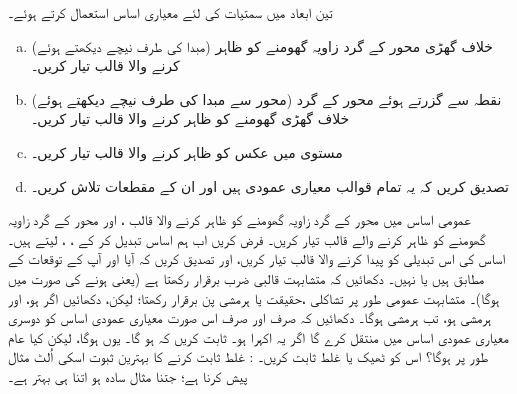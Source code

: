 تین ابعاد میں سمتیات کی لئے معیاری اساس  استعمال کرتے ہوئے۔
\begin{enumerate}[a.]
\item
(مبدا  کی طرف نیچے دیکھتے ہوئے)  خلاف گھڑی  محور کے گرد زاویہ  گھومنے کو ظاہر کرنے والا قالب تیار کریں۔
\item
نقطہ  سے گزرتے ہوئے محور کے گرد (محور سے  مبدا کی طرف نیچے دیکھتے ہوئے) خلاف گھڑی  گھومنے کو ظاہر کرنے والا قالب تیار کریں۔
\item
 مستوی  میں عکس کو ظاہر کرنے والا قالب تیار کریں۔
\item
 تصدیق کریں کہ یہ تمام قوالب معیاری عمودی ہیں اور ان کے مقطعات تلاش  کریں۔
\end{enumerate}
عمومی اساس  میں  محور  کے گرد زاویہ  گھومنے کو ظاہر کرنے والا قالب ،  اور محور  کے گرد زاویہ  گھومنے کو ظاہر کرنے والے قالب  تیار کریں۔ فرض کریں اب ہم اساس تبدیل کر کے ، ،  لیتے ہیں۔  اساس کی اس تبدیلی کو پیدا کرنے والا قالب تیار کریں،  اور تصدیق کریں کہ آیا
  اور  آپ کے توقعات کے مطابق ہیں یا نہیں۔
دکھائیں کہ متشابہت قالبی ضرب برقرار رکھتا ہے (یعنی   ہونے کی صورت میں   ہوگا)۔  متشابہت عمومی طور پر   تشاکلی ،حقیقت یا ہرمشی پن برقرار  رکھتا؛  لیکن،  دکھائیں اگر    ہو،  اور  ہرمشی ہو،  تب  ہرمشی ہوگا۔ دکھائیں کہ  صرف اور صرف  اس صورت معیاری عمودی اساس کو دوسری معیاری عمودی اساس میں منتقل کرے گا اگر یہ اکہرا ہو۔
ثابت کریں  کہ  ہو گا۔ یوں
  ہوگا، لیکن  کیا عام طور پر
   ہوگا؟ اس کو ٹھیک یا غلط ثابت کریں۔ : غلط ثابت کرنے کا  بہترین ثبوت  اسکی اُلٹ مثال پیش کرنا ہے؛  جتنا مثال سادہ ہو  اتنا ہی بہتر ہے۔

